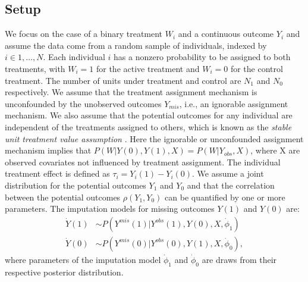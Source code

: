 	\subsection{Setup}  
We focus on the case of a binary treatment $W_{i}$ and a continuous outcome $Y_{i}$ and assume the data come from a random sample of individuals, indexed by $i \in {1,\dots,N}$. Each individual $i$ has a nonzero probability to be assigned to both treatments, with $W_{i} = 1$ for the active treatment and $W_{i} = 0$ for the control treatment. The number of units under treatment and control are $N_{1}$ and $N_{0}$ respectively. We assume that the treatment assignment mechanism is unconfounded by the unobserved outcomes $Y_{mis}$, i.e., an ignorable assignment mechanism. We also assume that the potential outcomes for any individual are independent of the treatments assigned to others, which is known as the \emph{stable unit treatment value assumption} \citep{imbens2015causal}. Here the ignorable or unconfounded assignment mechanism implies that $P(W|Y(0), Y(1), X) = P(W|Y_{obs}, X)$, where X are observed covariates not influenced by treatment assignment. The individual treatment effect is defined as $\tau_{i} = Y_{i}(1) - Y_{i}(0)$. We assume a joint distribution for the potential outcomes $Y_{1}$ and $Y_{0}$ and that the correlation between the potential outcomes $\rho(Y_{1}, Y_{0})$ can be quantified by one or more parameters. The imputation models for missing outcomes $Y(1)$ and $Y(0)$ are: 
\begin{align}
	\dot{Y}(1) &\sim P(Y^{mis}(1)|Y^{obs}(1), Y(0), X, \dot{\phi}_{1})\\
	\dot{Y}(0) &\sim P(Y^{mis}(0)|Y^{obs}(0), Y(1), X, \dot{\phi}_{0}),
\end{align}
where parameters of the imputation model $\dot{\phi}_{1}$ and $\dot{\phi}_{0}$ are draws from their respective posterior distribution.
